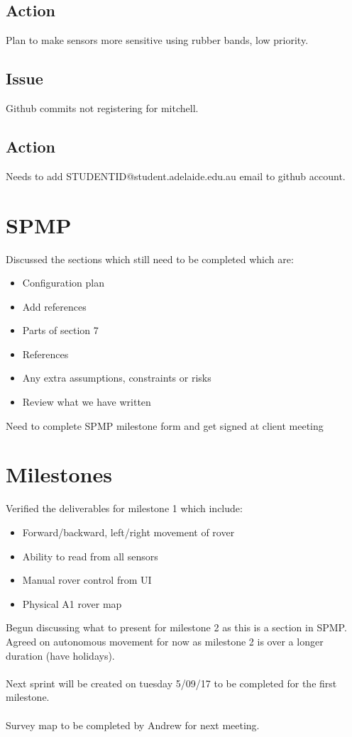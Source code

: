 \documentclass[11pt, a4paper]{article}
\begin{document}
	\subsection*{Action} Plan to make sensors more sensitive using rubber bands, low priority.
	\\\subsection*{Issue} Github commits not registering for mitchell.
	\subsection*{Action} Needs to add STUDENTID@student.adelaide.edu.au email to github account.
	
\section{SPMP}
	Discussed the sections which still need to be completed which are:
	\begin{itemize}
		\item Configuration plan
		\item Add references
		\item Parts of section 7
		\item References
		\item Any extra assumptions, constraints or risks
		\item Review what we have written
	\end{itemize}
	Need to complete SPMP milestone form and get signed at client meeting
\section{Milestones}
	Verified the deliverables for milestone 1 which include:
	\begin{itemize}
		\item Forward/backward, left/right movement of rover
		\item Ability to read from all sensors
		\item Manual rover control from UI
		\item Physical A1 rover map
	\end{itemize}
	Begun discussing what to present for milestone 2 as this is a section in SPMP. Agreed on autonomous movement for now as milestone 2 is over a longer duration (have holidays).
	\\\\Next sprint will be created on tuesday 5/09/17 to be completed for the first milestone.
	\\\\Survey map to be completed by Andrew for next meeting.
\end{document}
